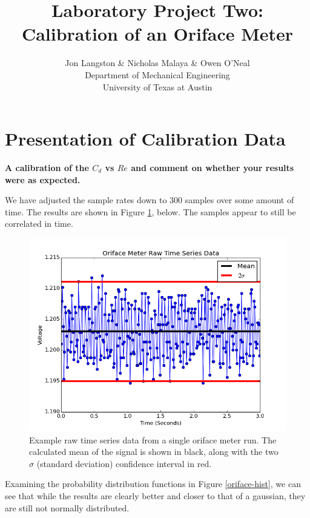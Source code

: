 \documentclass{article}
\title{\bf{Laboratory Project Two: Calibration of an Oriface Meter}}
\author{Jon Langston \& Nicholas Malaya \& Owen O'Neal \\ Department of Mechanical Engineering \\ University of Texas at Austin} \date{}
\begin{document}
\maketitle
\date{}
\newpage
\section{Presentation of Calibration Data}

\textbf{A calibration of the $C_d$ vs $Re$ and comment on whether your
results were as expected.}   


We have adjusted the sample rates down to 300 samples over some amount
of time.  The results are shown in Figure
\ref{oriface-time}, below. The samples appear to still be correlated in
time. 


\begin{figure}[!htb]
  \begin{center}
    \includegraphics[width = 12 cm]{figs/oriface_time.png}
    \caption{Example raw time series data from a single oriface meter 
      run. The calculated mean of the signal is shown in black, along with
      the two $\sigma$ (standard deviation) confidence interval in
      red.}
    \label{oriface-time}
  \end{center}
\end{figure}

Examining the probability distribution functions in Figure \ref{oriface-hist},
we can see that while the results are clearly better and closer to that
of a gaussian, they are still not normally distributed. 
\end{document}

